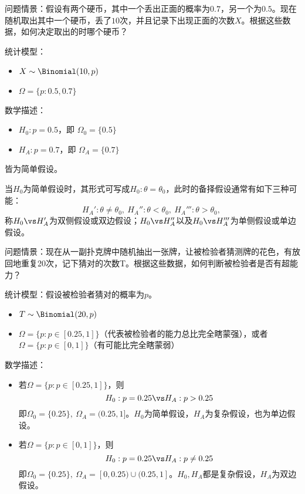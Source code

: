 \begin{example}[硬币辨别实验]\label{ex:coins}
    问题情景：假设有两个硬币，其中一个丢出正面的概率为$0.7$，另一个为$0.5$。现在随机取出其中一个硬币，丢了$10$次，并且记录下出现正面的次数$X$。根据这些数据，如何决定取出的时哪个硬币？

    统计模型：
    \begin{itemize}
        \item $X \sim \Binomial(10,p)$
        \item $\Omega = \{p: 0.5, 0.7 \}$
    \end{itemize}

    数学描述：
    \begin{itemize}
        \item $H_0: p=0.5$，即 $\Omega_0=\{ 0.5 \}$
        \item $H_A: p=0.7$，即 $\Omega_A=\{ 0.7 \}$
    \end{itemize}
    皆为简单假设。
\end{example}

当$H_0$为简单假设时，其形式可写成$H_0:\theta = \theta_0$，此时的备择假设通常有如下三种可能：
\[ H_A':\theta \neq \theta_0,\ H_A'':\theta < \theta_0,\ H_A''':\theta > \theta_0,\ \]
称$H_0 \vs H_A'$为双侧假设或双边假设；$H_0 \vs H_A''$以及$H_0 \vs H_A'''$为单侧假设或单边假设。

\begin{example}[超能力检验]
    问题情景：现在从一副扑克牌中随机抽出一张牌，让被检验者猜测牌的花色，有放回地重复20次，记下猜对的次数T。根据这些数据，如何判断被检验者是否有超能力？

    统计模型：假设被检验者猜对的概率为$p$。
    \begin{itemize}
        \item $T \sim \Binomial(20,p)$
        \item $\Omega = \{p: p \in [0.25,1]\}$（代表被检验者的能力总比完全瞎蒙强），或者$\Omega = \{p: p \in [0,1]\}$（有可能比完全瞎蒙弱）
    \end{itemize}

    数学描述：
    \begin{itemize}
        \item 若$\Omega = \{p: p \in [0.25,1]\}$，则
              \[ H_0: p=0.25 \vs H_A: p > 0.25  \]
              即$\Omega_0=\{ 0.25 \},\ \Omega_A=(0.25,1]$。$H_0$为简单假设，$H_A$为复杂假设，也为单边假设。
        \item 若$\Omega = \{p: p \in [0,1]\}$，则
              \[ H_0: p=0.25 \vs H_A: p \neq 0.25  \]
              即$\Omega_0=\{ 0.25 \},\ \Omega_A=[0,0.25)\cup (0.25,1]$。$H_0,H_A$都是复杂假设，$H_A$为双边假设。
    \end{itemize}
\end{example}

